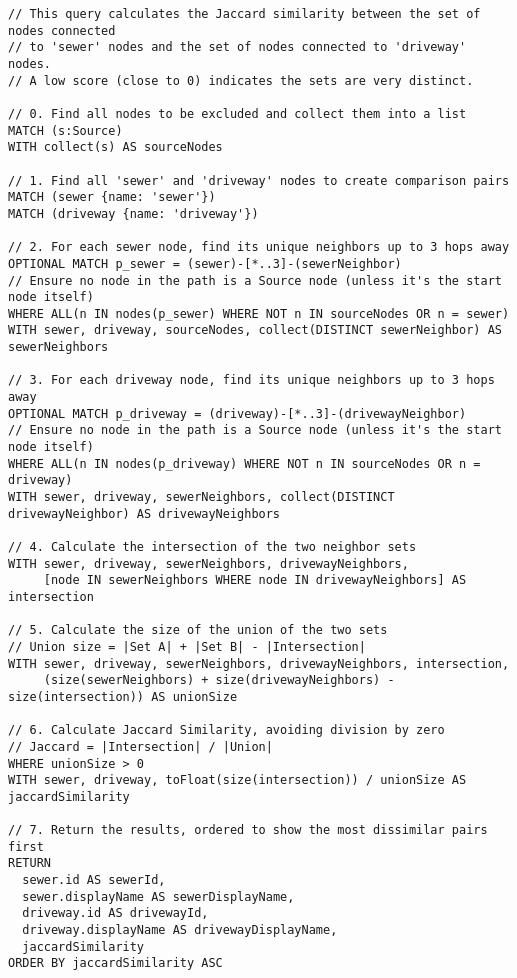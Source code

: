 \begin{verbatim}
// This query calculates the Jaccard similarity between the set of nodes connected
// to 'sewer' nodes and the set of nodes connected to 'driveway' nodes.
// A low score (close to 0) indicates the sets are very distinct.

// 0. Find all nodes to be excluded and collect them into a list
MATCH (s:Source)
WITH collect(s) AS sourceNodes

// 1. Find all 'sewer' and 'driveway' nodes to create comparison pairs
MATCH (sewer {name: 'sewer'})
MATCH (driveway {name: 'driveway'})

// 2. For each sewer node, find its unique neighbors up to 3 hops away
OPTIONAL MATCH p_sewer = (sewer)-[*..3]-(sewerNeighbor)
// Ensure no node in the path is a Source node (unless it's the start node itself)
WHERE ALL(n IN nodes(p_sewer) WHERE NOT n IN sourceNodes OR n = sewer)
WITH sewer, driveway, sourceNodes, collect(DISTINCT sewerNeighbor) AS sewerNeighbors

// 3. For each driveway node, find its unique neighbors up to 3 hops away
OPTIONAL MATCH p_driveway = (driveway)-[*..3]-(drivewayNeighbor)
// Ensure no node in the path is a Source node (unless it's the start node itself)
WHERE ALL(n IN nodes(p_driveway) WHERE NOT n IN sourceNodes OR n = driveway)
WITH sewer, driveway, sewerNeighbors, collect(DISTINCT drivewayNeighbor) AS drivewayNeighbors

// 4. Calculate the intersection of the two neighbor sets
WITH sewer, driveway, sewerNeighbors, drivewayNeighbors,
     [node IN sewerNeighbors WHERE node IN drivewayNeighbors] AS intersection

// 5. Calculate the size of the union of the two sets
// Union size = |Set A| + |Set B| - |Intersection|
WITH sewer, driveway, sewerNeighbors, drivewayNeighbors, intersection,
     (size(sewerNeighbors) + size(drivewayNeighbors) - size(intersection)) AS unionSize

// 6. Calculate Jaccard Similarity, avoiding division by zero
// Jaccard = |Intersection| / |Union|
WHERE unionSize > 0
WITH sewer, driveway, toFloat(size(intersection)) / unionSize AS jaccardSimilarity

// 7. Return the results, ordered to show the most dissimilar pairs first
RETURN
  sewer.id AS sewerId,
  sewer.displayName AS sewerDisplayName,
  driveway.id AS drivewayId,
  driveway.displayName AS drivewayDisplayName,
  jaccardSimilarity
ORDER BY jaccardSimilarity ASC
\end{verbatim}

